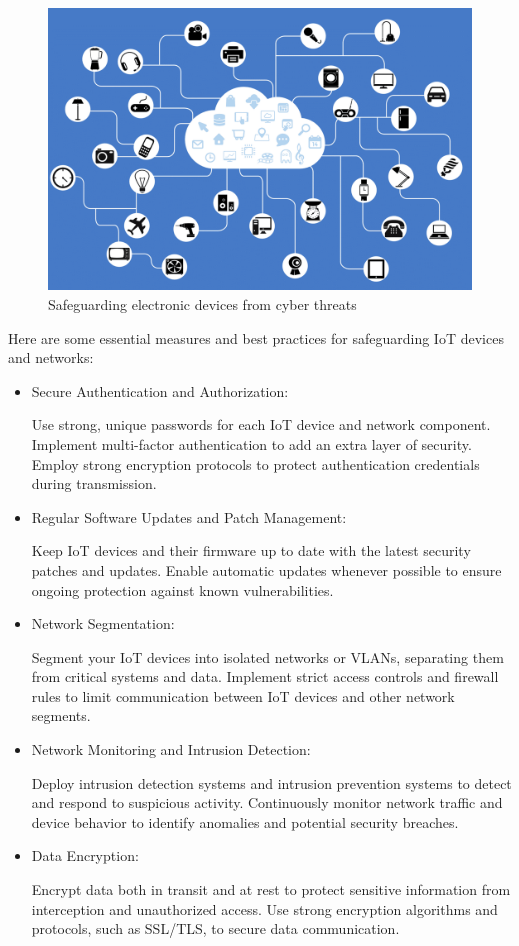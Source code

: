 \documentclass[conference]{IEEEtran}
\begin{document}
\begin{figure}
    \centering
    \includegraphics[width=1.1\linewidth]{asset-25.png}
    \caption{Safeguarding electronic devices from cyber threats}
    \label{fig:enter-label}
\end{figure}

Here are some essential measures and best practices for safeguarding IoT devices and networks:

\begin{itemize}
    \item Secure Authentication and Authorization:
    
Use strong, unique passwords for each IoT device and network component.
Implement multi-factor authentication to add an extra layer of security.
Employ strong encryption protocols to protect authentication credentials during transmission.
    \item Regular Software Updates and Patch Management:

Keep IoT devices and their firmware up to date with the latest security patches and updates.
Enable automatic updates whenever possible to ensure ongoing protection against known vulnerabilities.
    \item Network Segmentation:

Segment your IoT devices into isolated networks or VLANs, separating them from critical systems and data.
Implement strict access controls and firewall rules to limit communication between IoT devices and other network segments.
    \item Network Monitoring and Intrusion Detection:

Deploy intrusion detection systems and intrusion prevention systems to detect and respond to suspicious activity.
Continuously monitor network traffic and device behavior to identify anomalies and potential security breaches.
    \item Data Encryption:

Encrypt data both in transit and at rest to protect sensitive information from interception and unauthorized access.
Use strong encryption algorithms and protocols, such as SSL/TLS, to secure data communication.
\end{itemize}
\end{document}
